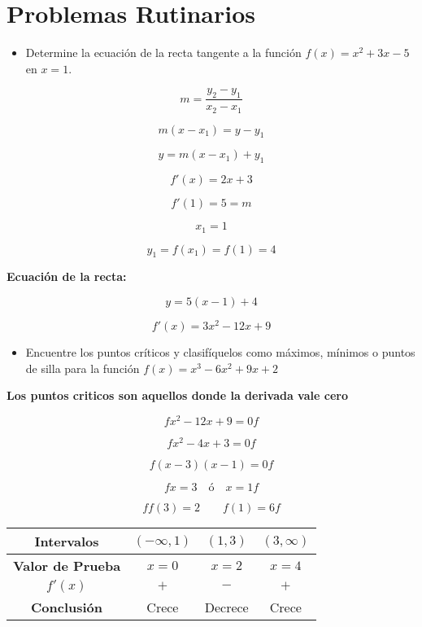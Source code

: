 \section{Problemas Rutinarios}

\begin{itemize}
    \item Determine la ecuación de la recta tangente a la función \( f(x) = x^2 + 3x - 5 \) en \( x = 1 \).
\end{itemize}

\[m = \frac{y_2 - y_1}{x_2 - x_1}\]

\[m(x - x_1) = y - y_1\]

\[y = m(x - x_1) + y_1\]

\[f'(x) = 2x + 3\]

\[f'(1) = 5 = m\]

\[x_1 = 1\]

\[y_1 = f(x_1) = f(1) = 4\]

\textbf{Ecuación de la recta:}

\[y = 5(x - 1) + 4\]

\[f'(x) = 3x^2 - 12x + 9\]

\begin{itemize}
    \item Encuentre los puntos críticos y clasifíquelos como máximos, mínimos o puntos de silla para la función \(f(x)=x^3-6x^2+9x+2\)
\end{itemize}
\textbf{Los puntos criticos son aquellos donde la derivada vale cero}

\[
fx^2 - 12x + 9 = 0f\]

\[fx^2 - 4x + 3 = 0f\]

\[f(x - 3)(x - 1) = 0f\]

\[fx = 3 \quad \text{ó} \quad x = 1f\]

\[ff(3) = 2 \quad \quad f(1) = 6f\]

\begin{center}
    \begin{tabular}{|c|c|c|c|}
        \hline
        \textbf{Intervalos} & $(-\infty, 1)$ & $(1, 3)$ & $(3, \infty)$ \\
        \hline
        \textbf{Valor de Prueba} & $x = 0$ & $x = 2$ & $x = 4$ \\
        \hline
        \textbf{$f'(x)$} & $+$ & $-$ & $+$ \\
        \hline
        \textbf{Conclusión} & Crece & Decrece & Crece \\
        \hline
    \end{tabular}
\end{center}

